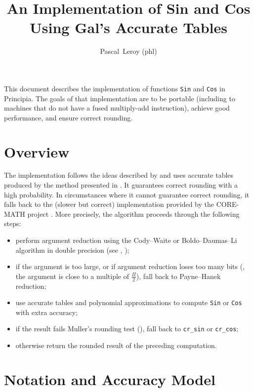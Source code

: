 \documentclass[10pt, a4paper, twoside]{basestyle}
\title{An Implementation of Sin and Cos Using Gal's Accurate Tables}
\date{\printdate{2026-06-22}}
\author{Pascal~Leroy (phl)}
\begin{document}
\maketitle
\begin{sloppypar}
\noindent
This document describes the implementation of functions \texttt{Sin} and \texttt{Cos} in Principia.  The goals of that implementation are to be portable (including to machines that do not have a fused multiply-add instruction), achieve good performance, and ensure correct rounding.
\end{sloppypar}

\section*{Overview}

The implementation follows the ideas described by \cite{GalBachelis1991} and uses accurate tables produced by the method presented in \cite{StehléZimmermann2005}.  It guarantees correct rounding with a high probability.  In circumstances where it cannot guarantee correct rounding, it falls back to the (slower but correct) implementation provided by the CORE-MATH project \cite{SibidanovZimmermannGlondu2022} \cite{ZimmermannSibidanovGlondu2024}.  More precisely, the algorithm proceeds through the following steps:
\begin{itemize}[nosep]
\item perform argument reduction using the Cody--Waite or Boldo--Daumas--Li algorithm in double precision (see \cite[379]{MullerBrisebarreDeDinechinJeannerodLefevreMelquiondRevolStehleTorres2010}, \cite[204]{Muller2016});
\item if the argument is too large, or if argument reduction loses too many bits (\idest, the argument is close to a multiple of $\frac{\Pi}{2}$), fall back to Payne--Hanek reduction;
\item use accurate tables and polynomial approximations to compute \texttt{Sin} or \texttt{Cos} with extra accuracy;
\item if the result fails Muller's rounding test (\cite[397-400]{MullerBrisebarreDeDinechinJeannerodLefevreMelquiondRevolStehleTorres2010}), fall back to \texttt{cr\_sin} or \texttt{cr\_cos};
\item otherwise return the rounded result of the preceding computation.
\end{itemize}

\section*{Notation and Accuracy Model} 
\end{document}
